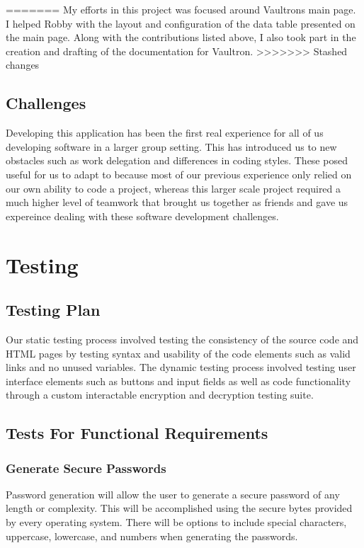\documentclass[11pt]{report}
\begin{document}
=======
My efforts in this project was focused around Vaultrons main page. I helped
Robby with the layout and configuration of the data table presented on the main
page. Along with the contributions listed above, I also took part in the creation 
and drafting of the documentation for Vaultron.
>>>>>>> Stashed changes



\section{Challenges}
Developing this application has been the first real experience for all of us
developing software in a larger group setting. This has introduced us to new
obstacles such as work delegation and differences in coding styles. These posed
useful for us to adapt to because most of our previous experience only relied
on our own ability to code a project, whereas this larger scale project 
required a much higher level of teamwork that brought us together as friends
and gave us expereince dealing with these software development challenges.




\chapter{Testing}

\section{Testing Plan}
Our static testing process involved testing the consistency of the source code 
and HTML pages by testing syntax and usability of the code elements such as 
valid links and no unused variables. The dynamic testing process involved
testing user interface elements such as buttons and input fields as well as 
code functionality through a custom interactable encryption and decryption
testing suite.


\section{Tests For Functional Requirements}

\subsection{Generate Secure Passwords}
Password generation will allow the user to generate a secure password of any length or 
complexity. This will be accomplished using the secure bytes provided by every
operating system. There will be options to include special characters, uppercase,
lowercase, and numbers when generating the passwords.
\end{document}
